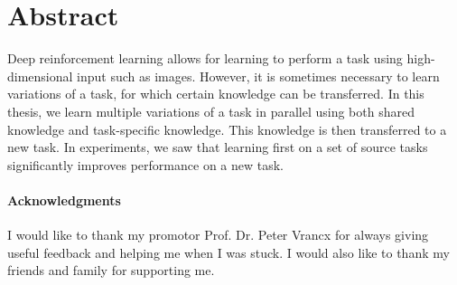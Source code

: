 \documentclass[11pt, a4paper, titlepage, twoside, openright]{book}
\numberwithin{equation}{section}
\providecommand{\keywords}[1]{\textbf{\textit{Index terms---}} #1}
\begin{document}
\frontmatter

\chapter{Abstract}
Deep reinforcement learning allows for learning to perform a task using high-dimensional input such as images. However, it is sometimes necessary to learn variations of a task, for which certain knowledge can be transferred. In this thesis, we learn multiple variations of a task in parallel using both shared knowledge and task-specific knowledge. This knowledge is then transferred to a new task. In experiments, we saw that learning first on a set of source tasks significantly improves performance on a new task.


\tableofcontents

\listoffigures
\listofalgorithms
\listoftables

\mainmatter










\backmatter
\subsubsection*{Acknowledgments}
I would like to thank my promotor Prof. Dr. Peter Vrancx for always giving useful feedback and helping me when I was stuck. I would also like to thank my friends and family for supporting me.


\printbibliography
\end{document}
